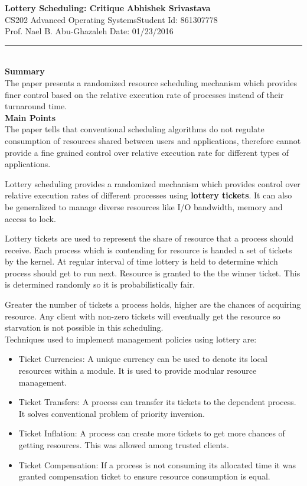 \documentclass[a4paper, 10pt]{article}
\begin{document}
\noindent
\large\textbf{Lottery Scheduling: Critique} \hfill \textbf{Abhishek Srivastava} \\
\normalsize CS202 Advanced Operating Systems\hfill Student Id: 861307778 \\
Prof. Nael B. Abu-Ghazaleh \hfill Date: 01/23/2016 \\
\hrule

\noindent
\\
\large\textbf{Summary}\\
The paper presents a randomized resource scheduling mechanism which provides finer control based on the relative execution rate of processes instead of their turnaround time.\\

\noindent
\large\textbf{Main Points}\\
The paper tells that conventional scheduling algorithms do not regulate consumption of resources shared between users and applications, therefore cannot provide a fine grained control over relative execution rate for different types of applications.

Lottery scheduling provides a randomized mechanism which provides control over relative execution rates of different processes using \textbf{lottery tickets}. It can also be generalized to manage diverse resources like I/O bandwidth, memory and access to lock.

Lottery tickets are used to represent the share of resource that a process should receive. Each process which is contending for resource is handed a set of tickets by the kernel. At regular interval of time lottery is held to determine which process should get to run next. Resource is granted to the the winner ticket. This is determined randomly so it is probabilistically fair. 

Greater the number of tickets a process holds, higher are the chances of acquiring resource. Any client with non-zero tickets will eventually get the resource so starvation is not possible in this scheduling.
\\
Techniques used to implement management policies using lottery are:
\begin{itemize}
	\item Ticket Currencies: A unique currency can be used to denote its local resources within a module. It is used to provide modular resource management. 
	\item Ticket Transfers: A process can transfer its tickets to the dependent process. It solves conventional problem of priority inversion.
	\item Ticket Inflation: A process can create more tickets to get more chances of getting resources. This was allowed among trusted clients.
	\item Ticket Compensation: If a process is not consuming its allocated time it was granted compensation ticket to ensure resource consumption is equal.
\end{itemize}
\end{document}
